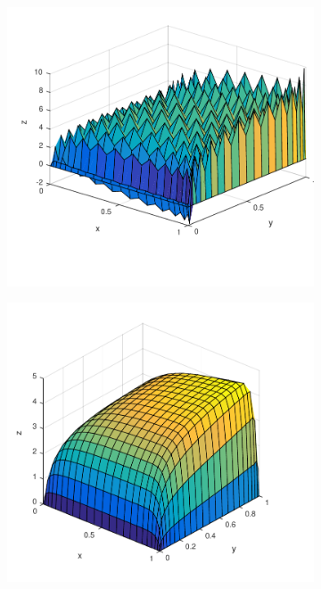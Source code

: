 %
\begin{figure}[h]
  \centering
  \begin{subfigure}[b]{0.48\textwidth}
	\includegraphics[width=\textwidth]{Figures/Spec_difftrans_aPos.pdf}
  \end{subfigure}%
  \quad
  \begin{subfigure}[b]{0.48\textwidth}
	\includegraphics[width=\textwidth]{Figures/SpecGLS_difftrans_aPos.pdf}

\end{subfigure}
\end{figure}
